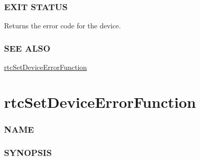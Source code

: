 \subsubsection{EXIT STATUS}\label{exit-status}

Returns the error code for the device.

\subsubsection{SEE ALSO}\label{see-also}

\hyperref[rtcsetdeviceerrorfunction]{rtcSetDeviceErrorFunction}

\pagebreak

\section{rtcSetDeviceErrorFunction}\label{rtcsetdeviceerrorfunction}

\subsubsection{NAME}\label{name}

\begin{Shaded}
\begin{Highlighting}[]
\OperatorTok{{-}}
\end{Highlighting}
\end{Shaded}

\subsubsection{SYNOPSIS}\label{synopsis}

\begin{Shaded}
\begin{Highlighting}[]

  \OperatorTok{(*}\OperatorTok{)(}
  \OperatorTok{*}\OperatorTok{,}
\OperatorTok{,}
   \OperatorTok{*}
\OperatorTok{);}

\OperatorTok{(}
\OperatorTok{,}
\OperatorTok{,}
  \OperatorTok{*}
\OperatorTok{);}
\end{Highlighting}
\end{Shaded}

